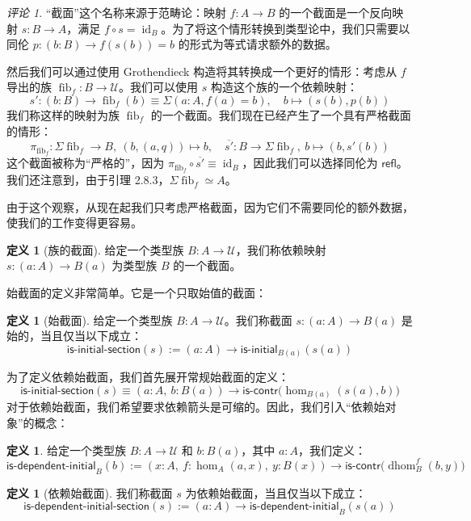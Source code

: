 \documentclass{ctexrep}
\theoremstyle{plain}
\theoremstyle{definition}
\newtheorem{definition}[theorem]{定义}
\theoremstyle{remark}
\newtheorem{remark}[theorem]{评论}
\theoremstyle{definition}
\theoremstyle{definition}
\theoremstyle{definition}
\newcommand{\coloneqq}{\mathrel{:=}}
\newcommand{\fib}{\operatorname{fib}}
\newcommand{\refl}{\mathsf{refl}}
\newcommand{\id}{\operatorname{id}}
\newcommand{\iscontr}{\mathsf{is\text{-}contr}}
\newcommand{\UU}{\mathcal{U}}
\newcommand{\dhom}{\operatorname{dhom}}
\newcommand{\isinitial}{\mathsf{is\text{-}initial}}
\newcommand{\isinitialsection}{\mathsf{is\text{-}initial\text{-}section}}
\newcommand{\isdepinitialsection}{\mathsf{is\text{-}dependent\text{-}initial\text{-}section}}
\newcommand{\isdepinitial}{\mathsf{is\text{-}dependent\text{-}initial}}
\begin{document}
\begin{remark}
“截面”这个名称来源于范畴论：映射 $f:A\to B$ 的一个截面是一个反向映射 $s:B\to A$，满足 $f\circ s = \id_B$。为了将这个情形转换到类型论中，我们只需要以同伦 $p:(b:B)\to f(s(b)) = b$ 的形式为等式请求额外的数据。

然后我们可以通过使用 Grothendieck 构造将其转换成一个更好的情形：考虑从 $f$ 导出的族 $\fib_f:B\to\UU$。我们可以使用 $s$ 构造这个族的一个依赖映射：
\[
s':(b:B)\to \fib_f(b) \equiv \Sigma(a:A, f(a)=b), \quad b\mapsto (s(b),p(b))
\]
我们称这样的映射为族 $\fib_f$ 的一个截面。我们现在已经产生了一个具有严格截面的情形：
\[
\pi_{\fib_f}:\Sigma\fib_f\to B,\ (b,(a,q))\mapsto b, \quad \overline{s'}:B\to\Sigma\fib_f,\ b\mapsto (b,s'(b))
\]
这个截面被称为“严格的”，因为 $\pi_{\fib_f}\circ\overline{s'}\equiv\id_B$，因此我们可以选择同伦为 $\refl$。我们还注意到，由于引理 2.8.3，$\Sigma\fib_f\simeq A$。

由于这个观察，从现在起我们只考虑严格截面，因为它们不需要同伦的额外数据，使我们的工作变得更容易。
\end{remark}

\begin{definition}[族的截面]
给定一个类型族 $B:A\to\UU$，我们称依赖映射 $s:(a:A)\to B(a)$ 为类型族 $B$ 的一个截面。
\end{definition}

始截面的定义非常简单。它是一个只取始值的截面：

\begin{definition}[始截面]
给定一个类型族 $B:A\to\UU$。我们称截面 $s:(a:A)\to B(a)$ 是始的，当且仅当以下成立：
\[
\isinitialsection(s) \coloneqq (a:A) \to \isinitial_{B(a)}(s(a))
\]
\end{definition}

为了定义依赖始截面，我们首先展开常规始截面的定义：
\[
\isinitialsection(s) \equiv (a:A,\ b:B(a)) \to \iscontr\big(\hom_{B(a)}(s(a),b)\big)
\]
对于依赖始截面，我们希望要求依赖箭头是可缩的。因此，我们引入“依赖始对象”的概念：

\begin{definition}
给定一个类型族 $B:A\to\UU$ 和 $b:B(a)$，其中 $a:A$，我们定义：
\[
\isdepinitial_B(b) \coloneqq (x:A,\ f:\hom_A(a,x),\ y:B(x)) \to \iscontr\big(\dhom_B^f(b,y)\big)
\]
\end{definition}

\begin{definition}[依赖始截面]
我们称截面 $s$ 为依赖始截面，当且仅当以下成立：
\[
\isdepinitialsection(s) \coloneqq (a:A) \to \isdepinitial_B(s(a))
\]
\end{definition}
\end{document}

